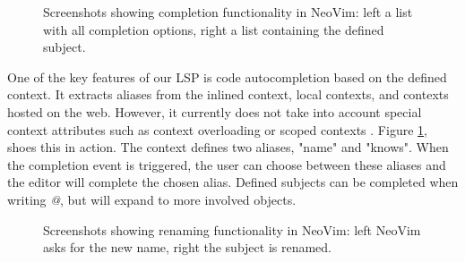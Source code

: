 \documentclass[
]{ceurart}
\begin{document}
\begin{figure}
\centering
{}
\caption{Screenshots showing completion functionality in NeoVim: left a list with all completion options, right a list containing the defined subject.}
\label{fig:complete}
\end{figure}


One of the key features of our LSP is code autocompletion based on the defined context. It extracts aliases from the inlined context, local contexts, and contexts hosted on the web. However, it currently does not take into account special context attributes such as context overloading or scoped contexts \cite{JSON-LD-W3C}. Figure \ref{fig:complete}, shoes this in action. The context defines two aliases, "name" and "knows". When the completion event is triggered, the user can choose between these aliases and the editor will complete the chosen alias. Defined subjects can be completed when writing \textit{@}, but will expand to more involved objects.

\begin{figure}
\centering
{}
\caption{Screenshots showing renaming functionality in NeoVim: left NeoVim asks for the new name, right the subject is renamed.}
\label{fig:rename}
\end{figure}
\end{document}
